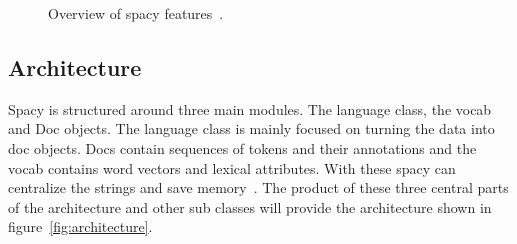 \begin{figure}[h]
    \caption{Overview of spacy features~\cite{spaCy101}.}
    \label{fig:features}
\end{figure}


\subsection{Architecture}\label{subsec:architecture}

Spacy is structured around three main modules.
The language class, the vocab and Doc objects.
The language class is mainly focused on turning the data into doc objects.
Docs contain sequences of tokens and their annotations and the vocab contains word vectors and lexical attributes.
With these spacy can centralize the strings and save memory~\cite{spaCy101}.
The product of these three central parts of the architecture and other sub classes will provide the
architecture shown in figure~\ref{fig:architecture}.
\clearpage


